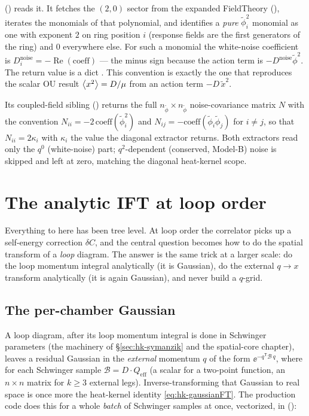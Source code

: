  () reads it.
It fetches the $(2,0)$ sector from the expanded FieldTheory
(), iterates the monomials of that polynomial, and
identifies a \emph{pure} $\tilde\phi_i^{2}$ monomial as one with exponent $2$ on
ring position $i$ (response fields are the first  generators of
the ring) and $0$ everywhere else. For such a monomial the white-noise
coefficient is $D^{\text{noise}}_i = -\operatorname{Re}(\text{coeff})$ --- the
minus sign because the action term is $-D^{\text{noise}}\tilde\phi^{2}$. The
return value is a dict . This convention is
exactly the one that reproduces the scalar OU result $\left\langle x^{2} \right\rangle=D/\mu$ from an
action term $-D\,\tilde x^{2}$.

Its coupled-field sibling 
() returns the full $n_{\tilde\phi}\times
n_{\tilde\phi}$ noise-covariance matrix $N$ with the convention
$N_{ii}=-2\,\mathrm{coeff}(\tilde\phi_i^{2})$ and
$N_{ij}=-\mathrm{coeff}(\tilde\phi_i\tilde\phi_j)$ for $i\ne j$, so that
$N_{ii}=2\kappa_i$ with $\kappa_i$ the value the diagonal extractor returns.
Both extractors read only the $q^{0}$ (white-noise) part; $q^{2}$-dependent
(conserved, Model-B) noise is skipped and left at zero, matching the diagonal
heat-kernel scope.

\section{The analytic IFT at loop order}\label{sec:hk-loops}

Everything to here has been tree level. At loop order the correlator picks up a
self-energy correction $\delta C$, and the central question becomes how to do the
spatial transform of a \emph{loop} diagram. The answer is the same trick at a
larger scale: do the loop momentum integral analytically (it is Gaussian), do
the external $q\to x$ transform analytically (it is again Gaussian), and never
build a $q$-grid.

\subsection{The per-chamber Gaussian}

A loop diagram, after its loop momentum integral is done in Schwinger
parameters (the machinery of \S\ref{sec:hk-symanzik} and the spatial-core
chapter), leaves a residual Gaussian in the \emph{external} momentum $q$ of the
form $\ee^{-q^{\mathsf T}\mathcal{B}\,q}$, where for each Schwinger sample
$\mathcal{B}=D\cdot Q_{\text{eff}}$ (a scalar for a two-point function, an
$n\times n$ matrix for $k\ge 3$ external legs). Inverse-transforming that
Gaussian to real space is once more the heat-kernel identity
\eqref{eq:hk-gaussianFT}. The production code does this for a whole \emph{batch}
of Schwinger samples at once, vectorized, in 
():

